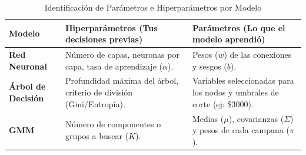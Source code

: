 \begin{table}[htbp]
\centering
\caption{Identificación de Parámetros e Hiperparámetros por Modelo}
\vspace{0.2cm}
\begin{tabular}{|l|p{5cm}|p{5cm}|}
\hline
\textbf{Modelo} & \textbf{Hiperparámetros} \newline (Tus decisiones previas) & \textbf{Parámetros} \newline (Lo que el modelo aprendió) \\ \hline
\textbf{Red Neuronal} & Número de capas, neuronas por capa, tasa de aprendizaje ($\alpha$). & Pesos ($w$) de las conexiones y sesgos ($b$). \\ \hline
\textbf{Árbol de Decisión} & Profundidad máxima del árbol, criterio de división (Gini/Entropía). & Variables seleccionadas para los nodos y umbrales de corte (ej: \$3000). \\ \hline
\textbf{GMM} & Número de componentes o grupos a buscar ($K$). & Medias ($\mu$), covarianzas ($\Sigma$) y pesos de cada campana ($\pi$). \\ \hline
\end{tabular}
\end{table}
